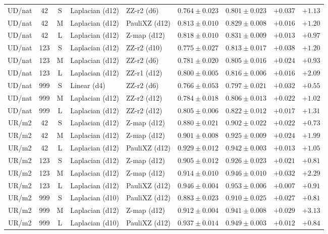 \documentclass[journal]{IEEEtran}
\begin{document}
\begin{table}[!t]
\begin{tabular}{@{}ccc ll cc rr@{}}
UD/nat & 42 & S & Laplacian (d12) & ZZ-r2 (d6) & $0.764\pm0.023$ & $0.801\pm0.023$ & $+0.037$ & $+1.13$ \\
UD/nat & 42 & M & Laplacian (d12) & PauliXZ (d12) & $0.813\pm0.010$ & $0.829\pm0.008$ & $+0.016$ & $+1.20$ \\
UD/nat & 42 & L & Laplacian (d12) & Z-map (d12) & $0.818\pm0.010$ & $0.831\pm0.009$ & $+0.013$ & $+0.97$ \\
UD/nat & 123 & S & Laplacian (d12) & ZZ-r2 (d10) & $0.775\pm0.027$ & $0.813\pm0.017$ & $+0.038$ & $+1.20$ \\
UD/nat & 123 & M & Laplacian (d12) & ZZ-r2 (d6) & $0.781\pm0.020$ & $0.805\pm0.016$ & $+0.024$ & $+0.93$ \\
UD/nat & 123 & L & Laplacian (d12) & ZZ-r1 (d12) & $0.800\pm0.005$ & $0.816\pm0.006$ & $+0.016$ & $+2.09$ \\
UD/nat & 999 & S & Linear (d4) & ZZ-r2 (d6) & $0.766\pm0.053$ & $0.797\pm0.021$ & $+0.032$ & $+0.55$ \\
UD/nat & 999 & M & Laplacian (d12) & ZZ-r2 (d12) & $0.784\pm0.018$ & $0.806\pm0.013$ & $+0.022$ & $+1.02$ \\
UD/nat & 999 & L & Laplacian (d12) & ZZ-r2 (d12) & $0.805\pm0.006$ & $0.822\pm0.012$ & $+0.017$ & $+1.31$ \\
UR/m2 & 42 & S & Laplacian (d12) & Z-map (d12) & $0.880\pm0.021$ & $0.902\pm0.022$ & $+0.022$ & $+0.73$ \\
UR/m2 & 42 & M & Laplacian (d12) & Z-map (d12) & $0.901\pm0.008$ & $0.925\pm0.009$ & $+0.024$ & $+1.99$ \\
UR/m2 & 42 & L & Laplacian (d12) & PauliXZ (d12) & $0.929\pm0.012$ & $0.942\pm0.003$ & $+0.013$ & $+1.05$ \\
UR/m2 & 123 & S & Laplacian (d12) & Z-map (d12) & $0.905\pm0.012$ & $0.926\pm0.023$ & $+0.021$ & $+0.81$ \\
UR/m2 & 123 & M & Laplacian (d12) & Z-map (d12) & $0.914\pm0.010$ & $0.946\pm0.010$ & $+0.032$ & $+2.29$ \\
UR/m2 & 123 & L & Laplacian (d12) & PauliXZ (d12) & $0.946\pm0.004$ & $0.953\pm0.006$ & $+0.007$ & $+0.91$ \\
UR/m2 & 999 & S & Laplacian (d10) & PauliXZ (d12) & $0.883\pm0.023$ & $0.910\pm0.025$ & $+0.027$ & $+0.81$ \\
UR/m2 & 999 & M & Laplacian (d12) & Z-map (d12) & $0.912\pm0.004$ & $0.941\pm0.008$ & $+0.029$ & $+3.13$ \\
UR/m2 & 999 & L & Laplacian (d10) & PauliXZ (d12) & $0.937\pm0.014$ & $0.949\pm0.003$ & $+0.012$ & $+0.84$ \\

\end{tabular}
\end{table}
\end{document}
